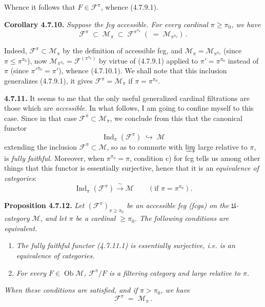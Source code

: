 \documentclass[11pt]{article}
\newcommand{\printedpage}[1]{\marginpar{\footnotesize p.~#1}}
\newcommand{\msp}[1]{\marginpar{\footnotesize [#1]}}
\newcommand{\Ob}{\operatorname{Ob}}
\newcommand{\Ind}{\operatorname{Ind}}
\begin{document}
Whence it follows that $F\in\mathcal{F}^{\pi}$, whence (4.7.9.1).

\textbf{Corollary 4.7.10.} \textit{Suppose the fcg accessible. For every cardinal $\pi\geqslant\pi_0$, we have}
\[
\mathcal{F}^{\pi} \;\subset\; \mathcal{M}_\pi \;\subset\; \mathcal{F}^{\pi^{\pi_0}} \; ( \;=\; \mathcal{M}_{\pi^{\pi_0}}) \, . \tag*{(4.7.10.1)}
\]

Indeed, $\mathcal{F}^{\pi}\subset\mathcal{M}_\pi$ by the definition of accessible fcg, and $\mathcal{M}_\pi=\mathcal{M}_{\pi^{\pi_0}}$ (since $\pi\leqslant\pi^{\pi_0}$), now $\mathcal{M}_{\pi^{\pi_0}}=\mathcal{F}^{(\pi^{\pi_0})}$ by virtue of (4.7.9.1) applied to $\pi'=\pi^{\pi_0}$ instead of $\pi$ (since $\pi'^{\pi_0}=\pi'$), whence (4.7.10.1). We shall note that this inclusion generalizes (4.7.9.1), it gives $\mathcal{F}^{\pi}=\mathcal{M}_\pi$ if $\pi=\pi^{\pi_0}$.

\textbf{4.7.11.} It seems to me that the only useful generalized cardinal filtrations are those which are \textit{accessible.} In what follows, I am going to confine myself to this case. Since in that case $\mathcal{F}^{\pi}\subset\mathcal{M}_\pi$, we conclude from this
\msp{page 178}
that the canonical functor
\[
\Ind_\pi(\mathcal{F}^{\pi}) \;\hookrightarrow\; \mathcal{M} \tag*{(4.7.11.1)}
\]
extending the inclusion $\mathcal{F}^{\pi}\subset\mathcal{M}$, so as to commute with $\varinjlim$ large relative to $\pi$, is \textit{fully faithful.} Moreover, when $\pi^{\pi_0}=\pi$, condition c) for fcg tells us among other things that this functor is essentially surjective, hence that it is an \textit{equivalence of categories}:
\[
\Ind_\pi(\mathcal{F}^{\pi}) \xrightarrow{\ \sim\ } \mathcal{M} \qquad (\text{if } \pi=\pi^{\pi_0}). \tag*{(4.7.11.2)}
\]

\textbf{Proposition 4.7.12.} \textit{Let $(\mathcal{F}^{\pi})_{\pi\geqslant\pi_0}$ be an accessible fcg (fcga) on the $\mathfrak{U}$-category $\mathcal{M}$, and let $\pi$ be a cardinal $\geqslant\pi_0$. The following conditions are equivalent.}
\begin{enumerate}[label=\textit{\alph*)}]
\item \textit{The fully faithful functor (4.7.11.1) is essentially surjective, i.e. is an equivalence of categories.}
\item \textit{For every $F\in\Ob\mathcal{M}$, $\mathcal{F}^{\pi}/F$ is a filtering category and large relative to $\pi$.}
\end{enumerate}

\noindent\printedpage{61}
\textit{When these conditions are satisfied, and if $\pi>\pi_0$, we have}
\[
\mathcal{F}^{\pi} \;=\; \mathcal{M}_\pi \, . \tag*{(4.7.12.1)}
\]
\end{document}
